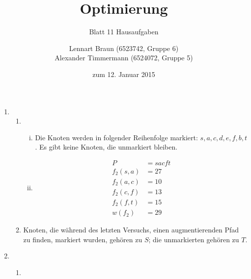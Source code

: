 \documentclass[a4paper]{scrartcl}
\title{Optimierung}
\subtitle{Blatt 11 Hausaufgaben}
\author{
	Lennart Braun (6523742, Gruppe 6) \\
    Alexander Timmermann (6524072, Gruppe 5)
}
\date{zum 12. Januar 2015}
\begin{document}
\maketitle

\begin{enumerate}[label=\bfseries\arabic*.]
    \item
        \begin{enumerate}
            \item
                \begin{enumerate}[(i)]
                    \item
                        Die Knoten werden in folgender Reihenfolge markiert:
                        $s, a, c, d, e, f, b, t$.
                        Es gibt keine Knoten, die unmarkiert bleiben.

                    \item
                        \begin{align}
                            P &= sacft \\
                            f_2(s,a) &= 27 \\
                            f_2(a, c) &= 10 \\
                            f_2(c, f) &= 13 \\
                            f_2(f, t) &= 15 \\
                            w(f_2) &= 29
                        \end{align}

                \end{enumerate}

            \item
                Knoten, die während des letzten Versuchs, einen augmentierenden
                Pfad zu finden, markiert wurden, gehören zu $S$; die
                unmarkierten gehören zu $T$.

        \end{enumerate}

    \item
        \begin{enumerate}
            \item \hfill \\
                \begin{figure}[h]
                    \centering
\end{figure}
\end{enumerate}
\end{enumerate}
\end{document}
